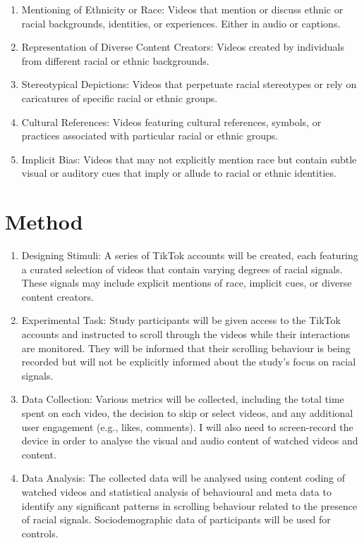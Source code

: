 \documentclass[a4paper, 12pt]{article}   %
\begin{document}
\begin{enumerate}
\item Mentioning of Ethnicity or Race: Videos that mention or discuss ethnic or racial backgrounds, identities, or experiences. Either in audio or captions.
\item Representation of Diverse Content Creators: Videos created by individuals from different racial or ethnic backgrounds.
\item Stereotypical Depictions: Videos that perpetuate racial stereotypes or rely on caricatures of specific racial or ethnic groups.
\item Cultural References: Videos featuring cultural references, symbols, or practices associated with particular racial or ethnic groups.
\item Implicit Bias: Videos that may not explicitly mention race but contain subtle visual or auditory cues that imply or allude to racial or ethnic identities.
\end{enumerate}



\section*{Method}

\begin{enumerate}
\item Designing Stimuli: A series of TikTok accounts will be created, each featuring a curated selection of videos that contain varying degrees of racial signals. These signals may include explicit mentions of race, implicit cues, or diverse content creators.
\item Experimental Task: Study participants will be given access to the TikTok accounts and instructed to scroll through the videos while their interactions are monitored. They will be informed that their scrolling behaviour is being recorded but will not be explicitly informed about the study's focus on racial signals.
\item Data Collection: Various metrics will be collected, including the total time spent on each video, the decision to skip or select videos, and any additional user engagement (e.g., likes, comments). I will also need to screen-record the device in order to analyse the visual and audio content of watched videos and content.  
\item Data Analysis: The collected data will be analysed using content coding of watched videos and  statistical analysis of behavioural and meta data  to identify any significant patterns in scrolling behaviour related to the presence of racial signals. Sociodemographic data of participants will be used for controls. 
\end{enumerate}
\end{document}
